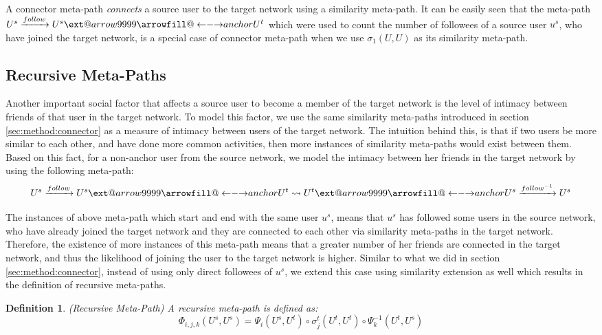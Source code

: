 \documentclass[conference]{IEEEtran}
\makeatletter
\newtheorem{definition}{Definition}[section]
\newcommand\xleftrightarrow[2][]{%
  \ext@arrow 9999{\longleftrightarrowfill@}{#1}{#2}}
\newcommand\longleftrightarrowfill@{%
  \arrowfill@\leftarrow\relbar\rightarrow}
\makeatother
\begin{document}
A connector meta-path \textit{connects} a source user to the target network using a similarity meta-path. It can be easily seen that the meta-path $U^s\xrightarrow{follow}U^s\xleftrightarrow{anchor}U^t$ which were used to count the number of followees of a source user $u^s$, who have joined the target network, is a special case of connector meta-path when we use $\sigma_1(U,U)$ as its similarity meta-path.

\subsection{Recursive Meta-Paths}

Another important social factor that affects a source user to become a member of the target network is the level of intimacy between friends of that user in the target network. To model this factor, we use the same similarity meta-paths introduced in section \ref{sec:method:connector} as a measure of intimacy between users of the target network. The intuition behind this, is that if two users be more similar to each other, and have done more common activities, then more instances of similarity meta-paths would exist between them. Based on this fact, for a non-anchor user from the source network, we model the intimacy between her friends in the target network by using the following meta-path:
\[
U^s\xrightarrow{follow}U^s\xleftrightarrow{anchor}U^t\rightsquigarrow U^t\xleftrightarrow{anchor}U^s\xrightarrow{follow^{-1}}U^s
\]

The instances of above meta-path which start and end with the same user $u^s$, means that $u^s$ has followed some users in the source network, who have already joined the target network and they are connected to each other via similarity meta-paths in the target network. Therefore, the existence of more instances of this meta-path means that a greater number of her friends are connected in the target network, and thus the likelihood of joining the user to the target network is higher. Similar to what we did in section \ref{sec:method:connector}, instead of using only direct followees of $u^s$, we extend this case using similarity extension as well which results in the definition of recursive meta-paths.

\begin{definition}{(Recursive Meta-Path)}
A recursive meta-path is defined as:
\begin{equation}
\Phi_{i,j,k}(U^s,U^s)=\Psi_i(U^s,U^t)\circ\sigma_j^t(U^t,U^t)\circ\Psi_k^{-1}(U^t,U^s)
\end{equation}
\end{definition}
 
\end{document}
